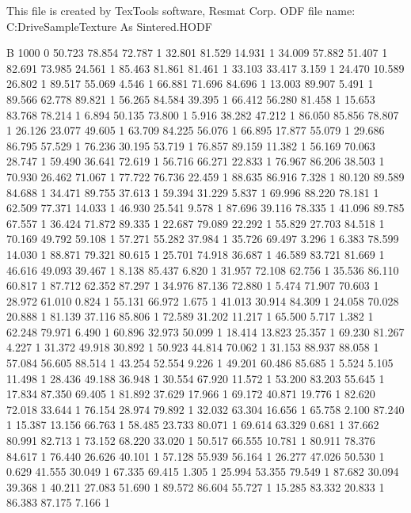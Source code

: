 This file is created by TexTools software, Resmat Corp.
ODF file name: C:\Users\mjay\Google Drive\Data\Rolled Sample\Bulk Texture\0 As Sintered\odf.HODF

B 1000 0
	50.723	78.854	72.787	1
	32.801	81.529	14.931	1
	34.009	57.882	51.407	1
	82.691	73.985	24.561	1
	85.463	81.861	81.461	1
	33.103	33.417	3.159	1
	24.470	10.589	26.802	1
	89.517	55.069	4.546	1
	66.881	71.696	84.696	1
	13.003	89.907	5.491	1
	89.566	62.778	89.821	1
	56.265	84.584	39.395	1
	66.412	56.280	81.458	1
	15.653	83.768	78.214	1
	6.894	50.135	73.800	1
	5.916	38.282	47.212	1
	86.050	85.856	78.807	1
	26.126	23.077	49.605	1
	63.709	84.225	56.076	1
	66.895	17.877	55.079	1
	29.686	86.795	57.529	1
	76.236	30.195	53.719	1
	76.857	89.159	11.382	1
	56.169	70.063	28.747	1
	59.490	36.641	72.619	1
	56.716	66.271	22.833	1
	76.967	86.206	38.503	1
	70.930	26.462	71.067	1
	77.722	76.736	22.459	1
	88.635	86.916	7.328	1
	80.120	89.589	84.688	1
	34.471	89.755	37.613	1
	59.394	31.229	5.837	1
	69.996	88.220	78.181	1
	62.509	77.371	14.033	1
	46.930	25.541	9.578	1
	87.696	39.116	78.335	1
	41.096	89.785	67.557	1
	36.424	71.872	89.335	1
	22.687	79.089	22.292	1
	55.829	27.703	84.518	1
	70.169	49.792	59.108	1
	57.271	55.282	37.984	1
	35.726	69.497	3.296	1
	6.383	78.599	14.030	1
	88.871	79.321	80.615	1
	25.701	74.918	36.687	1
	46.589	83.721	81.669	1
	46.616	49.093	39.467	1
	8.138	85.437	6.820	1
	31.957	72.108	62.756	1
	35.536	86.110	60.817	1
	87.712	62.352	87.297	1
	34.976	87.136	72.880	1
	5.474	71.907	70.603	1
	28.972	61.010	0.824	1
	55.131	66.972	1.675	1
	41.013	30.914	84.309	1
	24.058	70.028	20.888	1
	81.139	37.116	85.806	1
	72.589	31.202	11.217	1
	65.500	5.717	1.382	1
	62.248	79.971	6.490	1
	60.896	32.973	50.099	1
	18.414	13.823	25.357	1
	69.230	81.267	4.227	1
	31.372	49.918	30.892	1
	50.923	44.814	70.062	1
	31.153	88.937	88.058	1
	57.084	56.605	88.514	1
	43.254	52.554	9.226	1
	49.201	60.486	85.685	1
	5.524	5.105	11.498	1
	28.436	49.188	36.948	1
	30.554	67.920	11.572	1
	53.200	83.203	55.645	1
	17.834	87.350	69.405	1
	81.892	37.629	17.966	1
	69.172	40.871	19.776	1
	82.620	72.018	33.644	1
	76.154	28.974	79.892	1
	32.032	63.304	16.656	1
	65.758	2.100	87.240	1
	15.387	13.156	66.763	1
	58.485	23.733	80.071	1
	69.614	63.329	0.681	1
	37.662	80.991	82.713	1
	73.152	68.220	33.020	1
	50.517	66.555	10.781	1
	80.911	78.376	84.617	1
	76.440	26.626	40.101	1
	57.128	55.939	56.164	1
	26.277	47.026	50.530	1
	0.629	41.555	30.049	1
	67.335	69.415	1.305	1
	25.994	53.355	79.549	1
	87.682	30.094	39.368	1
	40.211	27.083	51.690	1
	89.572	86.604	55.727	1
	15.285	83.332	20.833	1
	86.383	87.175	7.166	1

